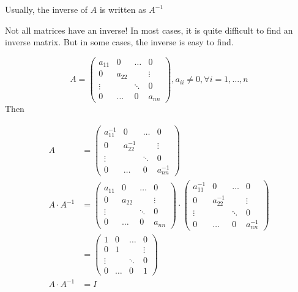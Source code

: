 \begin{notation}
Usually, the inverse of $A$ is written as $A^{-1}$
\end{notation}

\begin{note}
Not all matrices have an inverse! In most cases, it is quite difficult to find an inverse matrix. But in some cases, the inverse is easy to find.	
\end{note}
\begin{example}
\[
A = {\begin{pmatrix}
{{a_{11}}}&0& \ldots &0\\
0&{{a_{22}}}&{}& \vdots \\
 \vdots &{}& \ddots &0\\
0& \ldots &0&{{a_{nn}}}
\end{pmatrix}},a_{ii}\not=0,\forall i=1,\dots,n
\]	
Then

\begin{align*}
A &={\begin{pmatrix}
{a_{11}^{ - 1}}&0& \ldots &0\\
0&{a_{22}^{ - 1}}&{}& \vdots \\
 \vdots &{}& \ddots &0\\
0& \ldots &0&{a_{nn}^{ - 1}}
\end{pmatrix}}\\
A\cdot A^{-1} &= {\begin{pmatrix}
{{a_{11}}}&0& \ldots &0\\
0&{{a_{22}}}&{}& \vdots \\
 \vdots &{}& \ddots &0\\
0& \ldots &0&{{a_{nn}}}
\end{pmatrix}}	\cdot {\begin{pmatrix}
{a_{11}^{ - 1}}&0& \ldots &0\\
0&{a_{22}^{ - 1}}&{}& \vdots \\
 \vdots &{}& \ddots &0\\
0& \ldots &0&{a_{nn}^{ - 1}}
\end{pmatrix}}\\
 &= \left( {\begin{array}{*{20}{c}}
1&0& \ldots &0\\
0&1&{}& \vdots \\
 \vdots &{}& \ddots &0\\
0& \ldots &0&1
\end{array}} \right)\\
A\cdot A^{-1} &= I
\end{align*}	
\end{example}

